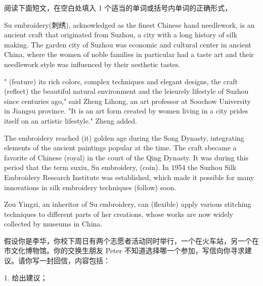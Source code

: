 \documentclass{英语试卷}
\begin{document}
\par 阅读下面短文，在空白处填入 1 个适当的单词或括号内单词的正确形式，\par
\par Su embroidery(刺绣), acknowledged as the finest Chinese hand needlework, is an ancient craft that originated from Suzhou, a city with a long history of silk making. The garden city of Suzhou was  economic and cultural center in ancient China, where the women of noble families in particular had a taste  art and their needlework style was influenced by their aesthetic tastes.\par
\par " (feature) its rich colors, complex techniques and elegant designs, the craft  (reflect) the beautiful natural environment and the leisurely lifestyle of Suzhou since centuries ago," said Zheng Lihong, an art professor at Soochow University in Jiangsu province. "It is an art form created by women living in a city  prides itself on an artistic lifestyle." Zheng added.\par
\par The embroidery reached  (it) golden age during the Song Dynasty, integrating elements of the ancient paintings popular at the time. The craft sbecame a favorite of Chinese  (royal) in the court of the Qing Dynasty. It was during this period that the term suxiu, Su embroidery,  (coin). In 1954 the Suzhou Silk Embroidery Research Institute was established, which made it possible for many innovations in silk embroidery techniques  (follow) soon.\par
\par Zou Yingzi, an inheritor of Su embroidery, can  (flexible) apply various stitching techniques to different parts of her creations, whose works are now widely collected by museums in China.\par
{}
\par 假设你是李华，你校下周日有两个志愿者活动同时举行，一个在火车站，另一个在市文化博物馆。你的交换生朋友 Peter 不知道选择哪一个参加，写信向你寻求建议。请你写一封回信，内容包括：\par
\par 1. 给出建议；\par
\end{document}
